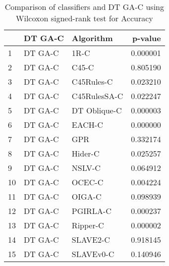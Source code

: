 \begin{table}
\footnotesize
\caption{Comparison of classifiers and DT GA-C using Wilcoxon signed-rank test for Accuracy}
\label{tab:DT GA-C wilcoxon Accuracy comparison}
\begin{tabular}{lllr}
\hline
 & DT GA-C & Algorithm & p-value \\
\hline
1 & DT GA-C & 1R-C & 0.000001 \\
2 & DT GA-C & C45-C & 0.805190 \\
3 & DT GA-C & C45Rules-C & 0.023210 \\
4 & DT GA-C & C45RulesSA-C & 0.022247 \\
5 & DT GA-C & DT Oblique-C & 0.000003 \\
6 & DT GA-C & EACH-C & 0.000000 \\
7 & DT GA-C & GPR & 0.332174 \\
8 & DT GA-C & Hider-C & 0.025257 \\
9 & DT GA-C & NSLV-C & 0.064912 \\
10 & DT GA-C & OCEC-C & 0.004224 \\
11 & DT GA-C & OIGA-C & 0.098939 \\
12 & DT GA-C & PGIRLA-C & 0.000237 \\
13 & DT GA-C & Ripper-C & 0.000002 \\
14 & DT GA-C & SLAVE2-C & 0.918145 \\
15 & DT GA-C & SLAVEv0-C & 0.140946 \\
\hline
\end{tabular}
\end{table}
